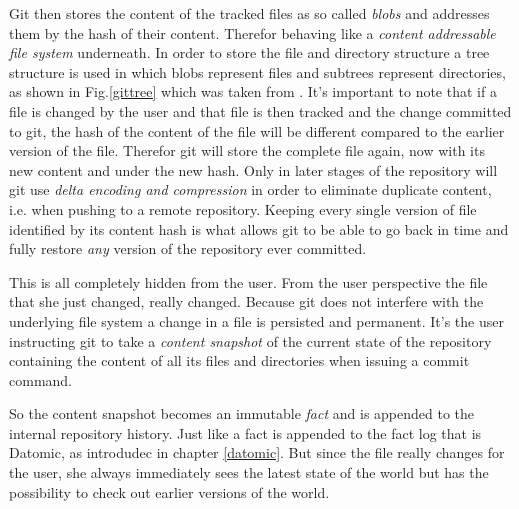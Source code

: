 Git then stores the content of the tracked files as so called
\textit{blobs} and addresses them by the hash of their content.
Therefor behaving like a \textit{content addressable file system}
underneath. In order to store the file and directory structure
a tree structure is used in which blobs represent files and
subtrees represent directories, as shown in Fig.\ref{gittree} which
was taken from \cite{gitinternals}. It's important to note that
if a file is changed by the user and that file is then tracked
and the change committed to git, the hash of the content of the
file will be different compared to the earlier version of the file.
Therefor git will store the complete file again, now with its
new content and under the new hash. Only in later stages of the
repository will git use \textit{delta encoding and compression}
in order to eliminate duplicate content, i.e. when pushing to
a remote repository.
Keeping every single version of file identified by its content
hash is what allows git to be able to go back in time and fully
restore \textit{any} version of the repository ever committed.

This is all completely hidden from the user. From the user
perspective the file that she just changed, really changed.
Because git does not interfere with the underlying file system
a change in a file is persisted and permanent. It's the user
instructing git to take a \textit{content snapshot} of the current
state of the repository containing the content of all its files
and directories when issuing a commit command.

So the content snapshot becomes an immutable \textit{fact} and is
appended to the internal repository history. Just like a fact is
appended to the fact log that is Datomic, as introdudec in chapter
\ref{datomic}. But since the file really changes for the user,
she always immediately sees the latest state of the world but
has the possibility to check out earlier versions of the world.

